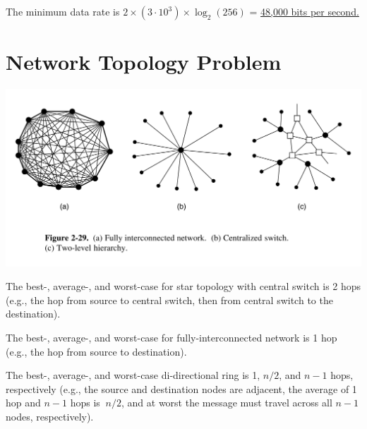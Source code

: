 The minimum data rate is $2 \times (3 \cdot 10^3) \times \log_2(256)$ = \ul{48,000 bits per second.}




\section{Network Topology Problem}

\includegraphics[width=\the\columnwidth]{network-topologies.png}

The best-, average-, and worst-case for star topology with central switch is 2 hops (e.g., the hop from source to central switch, then from central switch to the destination).

The best-, average-, and worst-case for fully-interconnected network is 1 hop (e.g., the hop from source to destination).

The best-, average-, and worst-case di-directional ring is 1, $n / 2$, and $n - 1$ hops, respectively (e.g., the source and destination nodes are adjacent, the average of 1 hop and $n - 1$ hops is $~ n/2$, and at worst the message must travel across all $n - 1$ nodes, respectively).





